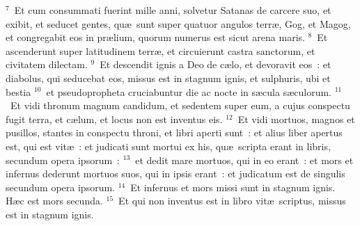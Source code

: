 ${}^{7}$~Et cum consummati fuerint mille anni, solvetur Satanas de carcere suo, et exibit, et seducet gentes, qu\ae\ sunt super quatuor angulos terr\ae , Gog, et Magog, et congregabit eos in pr\ae lium, quorum numerus est sicut arena maris.
${}^{8}$~Et ascenderunt super latitudinem terr\ae , et circuierunt castra sanctorum, et civitatem dilectam.
${}^{9}$~Et descendit ignis a Deo de c\ae lo, et devoravit eos~: et diabolus, qui seducebat eos, missus est in stagnum ignis, et sulphuris, ubi et bestia
${}^{10}$~et pseudopropheta cruciabuntur die ac nocte in s\ae cula s\ae culorum.
${}^{11}$~Et vidi thronum magnum candidum, et sedentem super eum, a cujus conspectu fugit terra, et c\ae lum, et locus non est inventus eis.
${}^{12}$~Et vidi mortuos, magnos et pusillos, stantes in conspectu throni, et libri aperti sunt~: et alius liber apertus est, qui est vit\ae~: et judicati sunt mortui ex his, qu\ae\ scripta erant in libris, secundum opera ipsorum~:
${}^{13}$~et dedit mare mortuos, qui in eo erant~: et mors et infernus dederunt mortuos suos, qui in ipsis erant~: et judicatum est de singulis secundum opera ipsorum.
${}^{14}$~Et infernus et mors missi sunt in stagnum ignis. H\ae c est mors secunda.
${}^{15}$~Et qui non inventus est in libro vit\ae\ scriptus, missus est in stagnum ignis.

